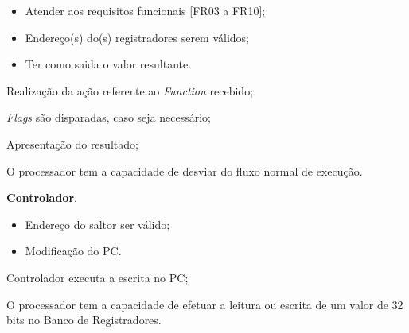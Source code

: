\documentclass{article}
\begin{document}
  \preconditions 
    \begin{itemize}
     \item Atender aos requisitos funcionais [FR03 a FR10];
     \item Endereço(s) do(s) registradores serem válidos;
    \end{itemize}

  \postconditions
    \begin{itemize}
     \item Ter como saida o valor resultante.
    \end{itemize}
  
  
  \begin{mainflow}
    \item Realização da ação referente ao \textit{Function} recebido;
    \item \textit{Flags} são disparadas, caso seja necessário;
    \item Apresentação do resultado;
  \end{mainflow}

   O processador tem a capacidade de desviar do fluxo normal de execução.
  
  \actors
    \begin{description}
     \item \textbf{Controlador}.
    \end{description}
    
  \preconditions 
    \begin{itemize}
     \item Endereço do saltor ser válido;
    \end{itemize}

  \postconditions
    \begin{itemize}
     \item Modificação do PC.
    \end{itemize}

  
  \begin{mainflow}
    \item Controlador executa a escrita no PC;
  \end{mainflow}  

   O processador tem a capacidade de efetuar a leitura ou escrita de um valor de 32 bits no Banco de Registradores.
  
\end{document}
